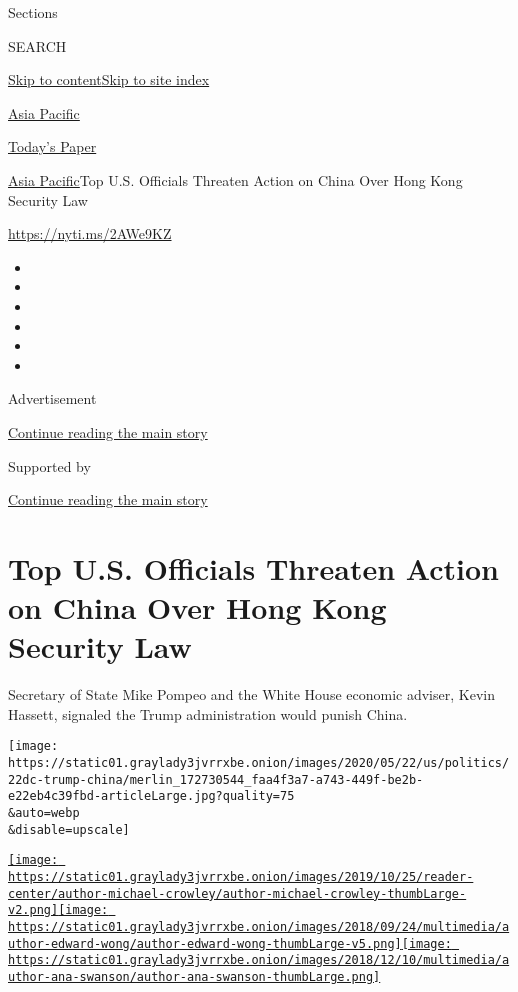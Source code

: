 Sections

SEARCH

\protect\hyperlink{site-content}{Skip to
content}\protect\hyperlink{site-index}{Skip to site index}

\href{https://www.nytimes3xbfgragh.onion/section/world/asia}{Asia
Pacific}

\href{https://myaccount.nytimes3xbfgragh.onion/auth/login?response_type=cookie\&client_id=vi}{}

\href{https://www.nytimes3xbfgragh.onion/section/todayspaper}{Today's
Paper}

\href{/section/world/asia}{Asia Pacific}\textbar{}Top U.S. Officials
Threaten Action on China Over Hong Kong Security Law

\url{https://nyti.ms/2AWe9KZ}

\begin{itemize}
\item
\item
\item
\item
\item
\item
\end{itemize}

Advertisement

\protect\hyperlink{after-top}{Continue reading the main story}

Supported by

\protect\hyperlink{after-sponsor}{Continue reading the main story}

\hypertarget{top-us-officials-threaten-action-on-china-over-hong-kong-security-law}{%
\section{Top U.S. Officials Threaten Action on China Over Hong Kong
Security
Law}\label{top-us-officials-threaten-action-on-china-over-hong-kong-security-law}}

Secretary of State Mike Pompeo and the White House economic adviser,
Kevin Hassett, signaled the Trump administration would punish China.

\texttt{[image: https://static01.graylady3jvrrxbe.onion/images/2020/05/22/us/politics/22dc-trump-china/merlin\_172730544\_faa4f3a7-a743-449f-be2b-e22eb4c39fbd-articleLarge.jpg?quality=75\\\&auto=webp\\\&disable=upscale]}

\href{https://www.nytimes3xbfgragh.onion/by/michael-crowley}{\texttt{[image: https://static01.graylady3jvrrxbe.onion/images/2019/10/25/reader-center/author-michael-crowley/author-michael-crowley-thumbLarge-v2.png]}}\href{https://www.nytimes3xbfgragh.onion/by/edward-wong}{\texttt{[image: https://static01.graylady3jvrrxbe.onion/images/2018/09/24/multimedia/author-edward-wong/author-edward-wong-thumbLarge-v5.png]}}\href{https://www.nytimes3xbfgragh.onion/by/ana-swanson}{\texttt{[image: https://static01.graylady3jvrrxbe.onion/images/2018/12/10/multimedia/author-ana-swanson/author-ana-swanson-thumbLarge.png]}}

